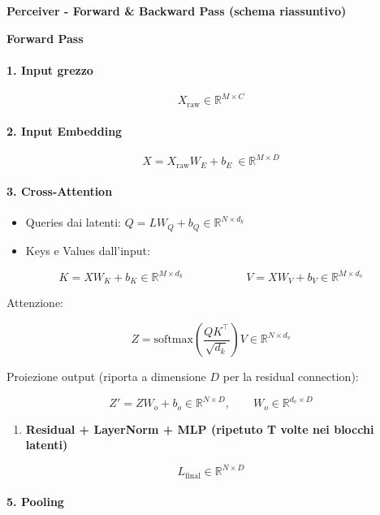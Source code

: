 \documentclass[
  11pt,
]{article}
\begin{document}
\textbf{Perceiver - Forward \& Backward Pass (schema riassuntivo)}

\textbf{Forward Pass}

\paragraph{1. \textbf{Input grezzo}}

\[X_{\text{raw}} \in \mathbb{R}^{M \times C}\]

\paragraph{2. \textbf{Input Embedding}}

\[X = X_{\text{raw}}W_{E} + b_{E}\  \in \mathbb{R}^{M \times D}\]

\paragraph{3. \textbf{Cross-Attention}}

\begin{itemize}
\item
  Queries dai latenti:
  \(Q = LW_{Q} + b_{Q} \in \mathbb{R}^{N \times d_k}\)
\item
  Keys e Values dall'input:
\end{itemize}


\[K = XW_{K} + b_{K} \in \mathbb{R}^{M \times d_k}\ \ \ \ \ \ \ \ \ \ \ \ \ \ \ \ \ \ \ \ \ \ \ \ \ V = XW_{V} + b_{V} \in \mathbb{R}^{M \times d_v}\]


Attenzione:


\[Z = \text{softmax}\!\left( \frac{QK^{\top}}{\sqrt{d_{k}}} \right)V \in \mathbb{R}^{N \times d_v}\]


Proiezione output (riporta a dimensione $D$ per la residual connection):

\[Z' = ZW_{o} + b_{o} \in \mathbb{R}^{N \times D}, \qquad W_o \in \mathbb{R}^{d_v \times D}\]

\begin{enumerate}
\def\labelenumi{\arabic{enumi}.}
\setcounter{enumi}{3}
\item
  \textbf{Residual + LayerNorm + MLP (ripetuto T volte nei blocchi
  latenti)}
\end{enumerate}

\[L_{\text{final}} \in \mathbb{R}^{N \times D}\]

\paragraph{5. Pooling}
\end{document}
